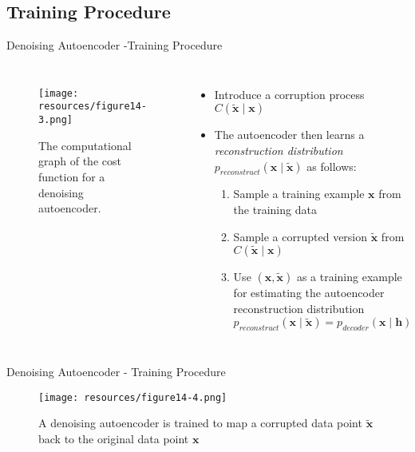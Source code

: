 \documentclass[handout]{beamer}
\begin{document}
\subsection{Training Procedure}
\begin{frame}[t]{Denoising Autoencoder -Training Procedure}
    \begin{columns}
        \begin{figure}[h]
            \centering
        \texttt{[image: resources/figure14-3.png]}
            \caption{The computational graph of the cost function for a denoising autoencoder.}
        \end{figure}
        \begin{itemize}
            \pause
            \item Introduce a corruption process $C( \pmb{\tilde{x}} \mid \pmb{x})$ 
            \pause
            \item The autoencoder then learns a \textit{reconstruction distribution} $p_{reconstruct}(\pmb{x}\mid\tilde{\pmb{x}} )$ as follows:\\
            \pause
                \begin{enumerate}
                    \item Sample a training example $\pmb{x}$ from the training data
            \pause
                    \item Sample a corrupted version $\pmb{\tilde{x}}$ from $C( \pmb{\tilde{x}} \mid \pmb{x})$
            \pause
                    \item Use $(\pmb{x},\pmb{\tilde{x}})$ as a training example for estimating the autoencoder reconstruction distribution $p_{reconstruct}(\pmb{x}\mid\pmb{\tilde{x}} ) = p_{decoder}(\pmb{x}\mid\pmb{h})$ 

                \end{enumerate}
        \end{itemize}
    \end{columns} 
\end{frame}

\begin{frame}[t]{Denoising Autoencoder - Training Procedure}
    \begin{figure}[h]
        \centering
        \texttt{[image: resources/figure14-4.png]}
        \caption{A denoising autoencoder is trained to map a corrupted data point $\tilde{\pmb{x}}$ back to
        the original data point $\pmb{x}$} 
    \end{figure}
\end{frame}
\end{document}
